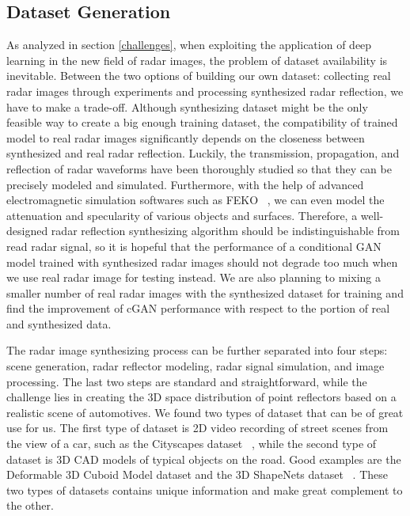 \subsection{Dataset Generation} \label{dataset}
As analyzed in section \ref{challenges}, when exploiting the application of deep learning in the new field of radar images, the problem of dataset availability is inevitable. Between the two options of building our own dataset: collecting real radar images through experiments and processing synthesized radar reflection, we have to make a trade-off. Although synthesizing dataset might be the only feasible way to create a big enough training dataset, the compatibility of trained model to real radar images significantly depends on the closeness between synthesized  and real radar reflection. Luckily, the transmission, propagation, and reflection of radar waveforms have been thoroughly studied so that they can be precisely modeled and simulated. Furthermore, with the help of advanced electromagnetic simulation softwares such as FEKO ~\cite{feko}, we can even model the attenuation and specularity of various objects and surfaces. Therefore, a well-designed radar reflection synthesizing algorithm should be indistinguishable from read radar signal, so it is hopeful that the performance of a conditional GAN model trained with synthesized radar images should not degrade too much when we use real radar image for testing instead. We are also planning to mixing a smaller number of real radar images with the synthesized dataset for training and find the improvement of cGAN performance with respect to the portion of real and synthesized data.  

The radar image synthesizing process can be further separated into four steps: scene generation, radar reflector modeling, radar signal simulation, and image processing. The last two steps are standard and straightforward, while the challenge lies in creating the 3D space distribution of point reflectors based on a realistic scene of automotives. We found two types of dataset that can be of great use for us. The first type of dataset is 2D video recording of street scenes from the view of a car, such as the Cityscapes dataset ~\cite{cityscapes}, while the second type of dataset is 3D CAD models of typical objects on the road. Good examples are the Deformable 3D Cuboid Model dataset and the 3D ShapeNets dataset ~\cite{3Ddata, shapenets}. These two types of datasets contains unique information and make great complement to the other.

